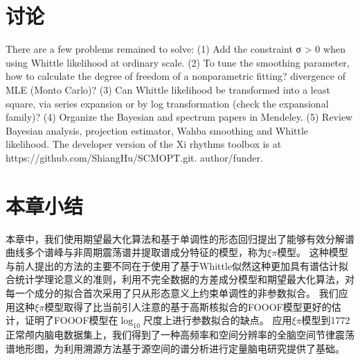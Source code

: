 \section{讨论}
There are a few problems remained to solve: (1) Add the constraint σ > 0 when using Whittle likelihood at
ordinary scale. (2) To tune the smoothing parameter, how to calculate the degree of freedom of a
nonparametric fitting? divergence of MLE (Monto Carlo)? (3) Can Whittle likelihood be transformed into a least
square, via series expansion or by log transformation (check the expansional family)? (4) Organize the Bayesian
and spectrum papers in Mendeley. (5) Review Bayesian analysis, projection estimator, Wahba smoothing and
Whittle likelihood.
The developer version of the Xi rhythms toolbox is at https://github.com/ShiangHu/SCMOPT.git.
author/funder. 

\section{本章小结}
本章中，我们使用期望最大化算法和基于单调性的形态回归提出了能够有效分解谱曲线多个谱峰与非周期震荡谱并提取谱成分特征的模型，称为$\xi\pi$模型。 这种模型与前人提出的方法的主要不同在于使用了基于Whittle似然这种更加具有谱估计拟合统计学理论意义的准则，利用不完全数据的方差成分模型和期望最大化算法，对每一个成分的拟合首次采用了只从形态意义上约束单调性的非参数拟合。 我们应用这种$\xi\pi$模型取得了比当前引人注意的基于高斯核拟合的FOOOF模型更好的估计，证明了FOOOF模型在$\log_{10}$尺度上进行参数拟合的缺点。 应用$\xi\pi$模型到1772正常颅内脑电数据集上，我们得到了一种高频率和空间分辨率的全脑空间节律震荡谱地形图，为利用溯源方法基于源空间的谱分析进行定量脑电研究提供了基础。